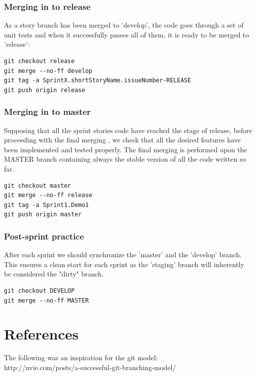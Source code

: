 \documentclass[11pt]{report}
\begin{document}
\subsection{Merging in to release}
As a story branch has been merged to 'develop', the code goes through a set of unit tests and when it successfully passes all of them, it is ready to be merged to 'release': 
\begin{verbatim}
git checkout release
git merge --no-ff develop
git tag -a SprintX.shortStoryName.issueNumber-RELEASE
git push origin release
\end{verbatim}
\subsection{Merging in to master}
Supposing that all the sprint stories code have reached the stage of release, before proceeding with the final merging , we check that all the desired features have been implemented and tested properly.
The final merging is performed upon the MASTER branch containing always the stable version of all the code written so far.
  \begin{verbatim}
git checkout master
git merge --no-ff release
git tag -a Sprint1.Demo1
git push origin master
\end{verbatim}
\subsection{Post-sprint practice}

After each sprint we should synchronize the 'master' and the 'develop' branch. This ensures a clean start for each sprint as the 'staging' branch will inherently be considered the "dirty" branch. 

  \begin{verbatim}
git checkout DEVELOP
git merge --no-ff MASTER
\end{verbatim}

\chapter{References}
The following was an inspiration for the git model:\\

http://nvie.com/posts/a-successful-git-branching-model/
\end{document}
